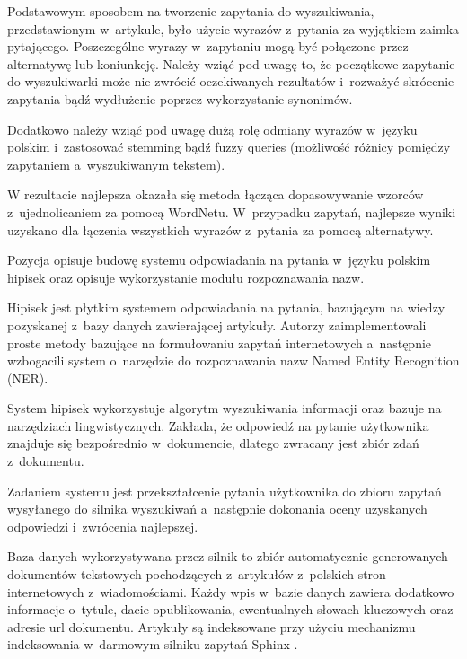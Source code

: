 Podstawowym sposobem na tworzenie zapytania do wyszukiwania, przedstawionym w~artykule, było użycie wyrazów z~pytania za wyjątkiem zaimka pytającego. Poszczególne wyrazy w~zapytaniu mogą być połączone przez alternatywę lub koniunkcję. Należy wziąć pod uwagę to, że początkowe zapytanie do wyszukiwarki może nie zwrócić oczekiwanych rezultatów i~rozważyć skrócenie zapytania bądź wydłużenie poprzez wykorzystanie synonimów. 

Dodatkowo należy wziąć pod uwagę dużą rolę odmiany wyrazów w~języku polskim i~zastosować stemming bądź fuzzy queries (możliwość różnicy pomiędzy zapytaniem a~wyszukiwanym tekstem).

W rezultacie najlepsza okazała się metoda łącząca dopasowywanie wzorców z~ujednolicaniem za pomocą WordNetu. W~przypadku zapytań, najlepsze wyniki uzyskano dla łączenia wszystkich wyrazów z~pytania za pomocą alternatywy\cite{przybyla-2013-question}. 

Pozycja \cite{polishQAS} opisuje budowę systemu odpowiadania na pytania w~języku polskim hipisek oraz opisuje wykorzystanie modułu rozpoznawania nazw.

Hipisek jest płytkim systemem odpowiadania na pytania, bazującym na wiedzy pozyskanej z~bazy danych zawierającej artykuły. Autorzy zaimplementowali proste metody bazujące na formułowaniu zapytań internetowych a~następnie wzbogacili system o~narzędzie do rozpoznawania nazw Named Entity Recognition (NER). 

System hipisek wykorzystuje algorytm wyszukiwania informacji oraz bazuje na narzędziach lingwistycznych. Zakłada, że odpowiedź na pytanie użytkownika znajduje się bezpośrednio w~dokumencie, dlatego zwracany jest zbiór zdań z~dokumentu.

Zadaniem systemu jest przekształcenie pytania użytkownika do zbioru zapytań wysyłanego do silnika wyszukiwań a~następnie dokonania oceny uzyskanych odpowiedzi i~zwrócenia najlepszej.

Baza danych wykorzystywana przez silnik to zbiór automatycznie generowanych dokumentów tekstowych pochodzących z~artykułów z~polskich stron internetowych z~wiadomościami. Każdy wpis w~bazie danych zawiera dodatkowo informacje o~tytule, dacie opublikowania, ewentualnych słowach kluczowych oraz adresie url dokumentu. Artykuły są indeksowane przy użyciu mechanizmu indeksowania w~darmowym silniku zapytań Sphinx \cite{sphinx}. 

